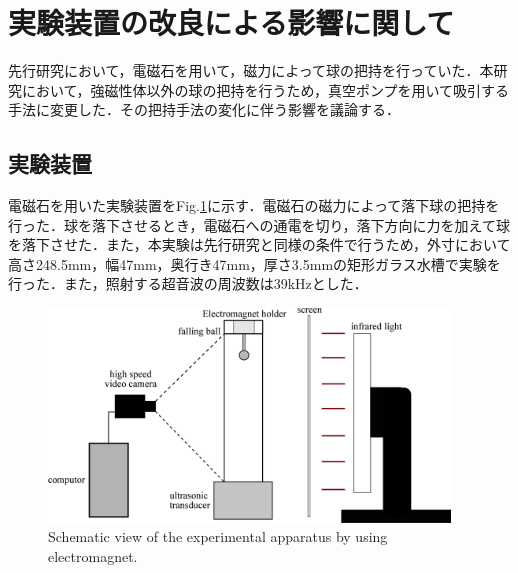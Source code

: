 \section{実験装置の改良による影響に関して}
\label{sec:reexp}

先行研究\cite{ref:8}において，電磁石を用いて，磁力によって球の把持を行っていた．本研究において，強磁性体以外の球の把持を行うため，真空ポンプを用いて吸引する手法に変更した．その把持手法の変化に伴う影響を議論する．

\subsection{実験装置}

電磁石を用いた実験装置をFig.\ref{fig:magnet_device}に示す．電磁石の磁力によって落下球の把持を行った．球を落下させるとき，電磁石への通電を切り，落下方向に力を加えて球を落下させた．また，本実験は先行研究と同様の条件で行うため，外寸において高さ248.5mm，幅47mm，奥行き47mm，厚さ3.5mmの矩形ガラス水槽で実験を行った．また，照射する超音波の周波数は39kHzとした．

\begin{figure}[ht]
    \centering
    \includegraphics[width=0.95\textwidth]{X-Appendix/device/magnet_device.eps}
    \caption{Schematic view of the experimental apparatus by using electromagnet.}
    \label{fig:magnet_device}
\end{figure}


